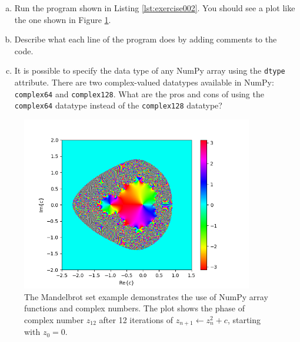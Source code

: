 \begin{enumerate}
        \begin{enumerate}[a)]
          \item Run the program shown in Listing \ref{lst:exercise002}. You
                should see a plot like the one shown in Figure \ref{fig:mandelbrot}.
          \item Describe what each line of the program does by adding comments to the code.
          \item It is possible to specify the data type of any NumPy array
                using the \verb|dtype| attribute. There are two complex-valued
                datatypes available in NumPy: \verb|complex64| and \verb|complex128|.
                What are the pros and cons of using the \verb|complex64| datatype
                instead of the \verb|complex128| datatype?
        \end{enumerate}


        \begin{figure}
          \includegraphics[width=0.9\textwidth]{ch02/figures/mystery.png}
          \caption{The Mandelbrot set example demonstrates the use of NumPy array functions and complex numbers. The plot
            shows the phase of complex number $z_{12}$ after 12 iterations of
            $z_{n+1} \leftarrow z_n^2 + c$, starting with $z_0 = 0$.}
          \label{fig:mandelbrot}
        \end{figure}

\end{enumerate}
